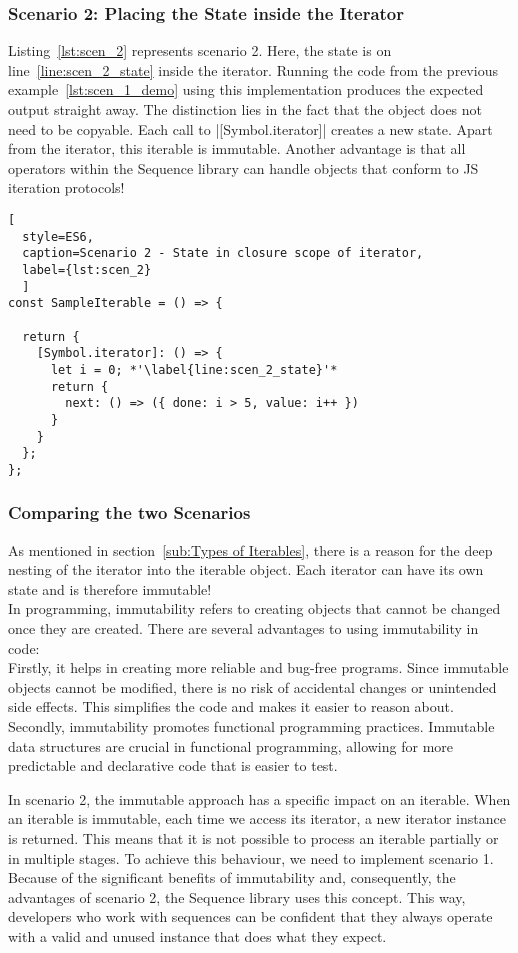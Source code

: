 \subsubsection{Scenario 2: Placing the State inside the Iterator}
\label{subsub:Scenario 2}
Listing~\ref{lst:scen_2} represents scenario 2. Here, the state is on
line~\ref{line:scen_2_state} inside the iterator. Running the code from the
previous example~\ref{lst:scen_1_demo} using this implementation produces the
expected output straight away. The distinction lies in the fact that the object
does not need to be copyable. Each call to |[Symbol.iterator]| creates a new
state. Apart from the iterator, this iterable is immutable. Another advantage
is that all operators within the Sequence library can handle objects that
conform to JS iteration protocols!

\begin{lstlisting}[
  style=ES6, 
  caption=Scenario 2 - State in closure scope of iterator,
  label={lst:scen_2}
  ]
const SampleIterable = () => {

  return {
    [Symbol.iterator]: () => {
      let i = 0; *'\label{line:scen_2_state}'*
      return {
        next: () => ({ done: i > 5, value: i++ })
      }
    }
  };
};
\end{lstlisting}


\subsubsection{Comparing the two Scenarios}
\label{subsub:Comparing the Two Scenarios}
As mentioned in section~\ref{sub:Types of Iterables}, there is a reason for 
the deep nesting of the iterator into the iterable object. 
Each iterator can have its own state and is therefore immutable! \\
In programming, immutability refers to creating objects that cannot be changed
once they are created. There are several advantages to using immutability in
code: \\
Firstly, it helps in creating more reliable and bug-free programs. Since
immutable objects cannot be modified, there is no risk of accidental changes or
unintended side effects. This simplifies the code and makes it easier to reason
about. \\
Secondly, immutability promotes functional programming practices. Immutable
data structures are crucial in functional programming, allowing for more
predictable and declarative code that is easier to test.

In scenario 2, the immutable approach has a specific impact on an iterable.
When an iterable is immutable, each time we access its iterator, a new iterator
instance is returned. This means that it is not possible to process an iterable
partially or in multiple stages. To achieve this behaviour, we need to implement
scenario 1.
\\
Because of the significant benefits of immutability and, consequently, the
advantages of scenario 2, the Sequence library uses this concept. This way,
developers who work with sequences can be confident that they always operate
with a valid and unused instance that does what they expect.

